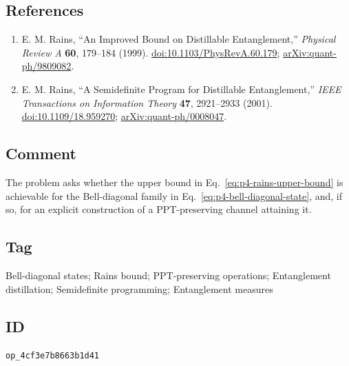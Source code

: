 \subsection*{References}

\begin{enumerate}[label={},leftmargin=4.8em,labelsep=0.5em]
  \footnotesize
  \item[\textup{[Rai99]}]\label{ref:p4-rains-1999}
  E. M. Rains, ``An Improved Bound on Distillable Entanglement,''
  \emph{Physical Review A} \textbf{60}, 179--184 (1999).
  \newline
  \href{https://doi.org/10.1103/PhysRevA.60.179}{doi:10.1103/PhysRevA.60.179};
  \href{https://arxiv.org/abs/quant-ph/9809082}{arXiv:quant-ph/9809082}.

  \item[\textup{[Rai01]}]\label{ref:p4-rains-2001}
  E. M. Rains, ``A Semidefinite Program for Distillable Entanglement,''
  \emph{IEEE Transactions on Information Theory} \textbf{47}, 2921--2933
  (2001). \href{https://doi.org/10.1109/18.959270}{doi:10.1109/18.959270};
  \href{https://arxiv.org/abs/quant-ph/0008047}{arXiv:quant-ph/0008047}.
\end{enumerate}

\subsection*{Comment}

The problem asks whether the upper bound in
Eq.~\eqref{eq:p4-rains-upper-bound} is achievable for the Bell-diagonal family
in Eq.~\eqref{eq:p4-bell-diagonal-state}, and, if so, for an explicit
construction of a PPT-preserving channel attaining it.

\subsection*{Tag}

Bell-diagonal states; Rains bound; PPT-preserving operations;
Entanglement distillation; Semidefinite programming; Entanglement measures

\subsection*{ID}

\texttt{op\_4cf3e7b8663b1d41}
